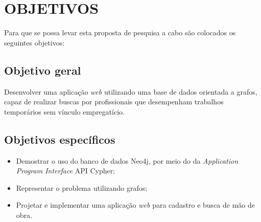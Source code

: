 \chapter{OBJETIVOS}

\par Para que se possa levar esta proposta de pesquisa a cabo são colocados os seguintes objetivos:

\section{Objetivo geral}

\par Desenvolver uma aplicação \textit{web} utilizando uma base de dados orientada a grafos, capaz de realizar buscas por profissionais que desempenham trabalhos temporários sem vínculo empregatício.

\section{Objetivos específicos}

\begin{itemize}
	\item Demostrar o uso do banco de dados Neo4j, por meio do da \textit{Application Program Interface} API Cypher;
	\item Representar o problema utilizando grafos;
	\item Projetar e implementar uma aplicação \textit{web} para cadastro e busca de mão de obra.
\end{itemize}


